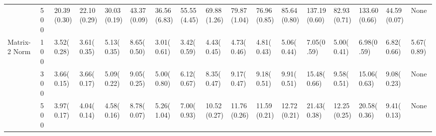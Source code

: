 \begin{table}[H]
{\begin{tabular}{ll|p{2cm}p{2cm}p{2cm}p{2cm}p{2cm}p{2cm}p{2cm}p{2cm}p{2cm}p{2cm}p{2cm}p{2cm}p{2cm}p{2cm}p{2cm}}
              & 500 &                       20.39(0.30) &                         22.10(0.29) &                         30.03(0.19) &                         43.37(0.09) &                                             36.56(6.83) &                                               55.55(4.45) &                                               69.88(1.26) &                                                 79.87(1.04) &                                               76.96(0.85) &                                                 85.64(0.80) &  137.19(0.60) &    82.93(0.71) &   133.60(0.66) &   44.59(0.07) &             None \\
Matrix-2 Norm & 100 &                        3.52(0.28) &                          3.61(0.35) &                          5.13(0.35) &                          8.65(0.50) &                                              3.01(0.61) &                                                3.42(0.59) &                                                4.43(0.45) &                                                  4.73(0.46) &                                                4.81(0.43) &                                                  5.06(0.44) &    7.05(0.59) &     5.00(0.41) &     6.98(0.59) &    6.82(0.66) &       5.67(0.89) \\
              & 300 &                        3.66(0.15) &                          3.66(0.17) &                          5.09(0.22) &                          9.05(0.25) &                                              5.00(0.80) &                                                6.12(0.67) &                                                8.35(0.47) &                                                  9.17(0.47) &                                                9.18(0.51) &                                                  9.91(0.51) &   15.48(0.66) &     9.58(0.51) &    15.06(0.63) &    9.08(0.23) &             None \\
              & 500 &                        3.97(0.17) &                          4.04(0.14) &                          4.58(0.16) &                          8.78(0.07) &                                              5.26(1.04) &                                                7.00(0.93) &                                               10.52(0.27) &                                                 11.76(0.26) &                                               11.59(0.21) &                                                 12.72(0.21) &   21.43(0.38) &    12.25(0.25) &    20.58(0.36) &    9.41(0.13) &             None \\
\bottomrule
\end{tabular}
}
\end{table}
